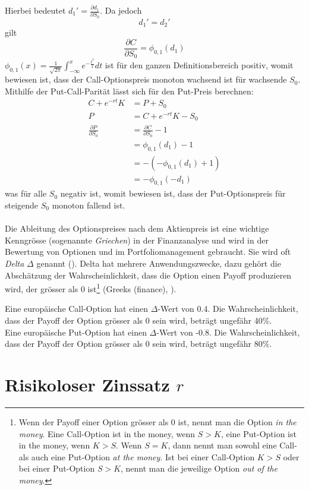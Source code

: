 \documentclass[11pt]{report} %
\newcommand\pd[2]{\displaystyle\frac{\partial #1}{\partial #2}}
\begin{document}
Hierbei bedeutet $d_1'=\pd{d_1}{S_0}$. Da jedoch $$d_1'=d_2'$$ gilt $$\pd{C}{S_0}=\phi_{0,1}(d_1)$$ $\phi_{0, 1}(x)=\frac{1}{\sqrt{2\pi}}\int_{-\infty}^{x}e^{-\frac{t^2}{2}}dt$ ist für den ganzen Definitionsbereich positiv, womit bewiesen ist, dass der Call-Optionspreis monoton wachsend ist für wachsende $S_0$. \\Mithilfe der Put-Call-Parität lässt sich für den Put-Preis berechnen:
    \begin{align*}
    C+e^{-rt}K&=P+S_0\\
    P&=C+e^{-rt}K-S_0\\
    \pd{P}{S_0}&=\pd{C}{S_0}-1\\
    &=\phi_{0,1}(d_1)-1\\
    &=-(-\phi_{0,1}(d_1)+1)\\
    &=-\phi_{0,1}(-d_1)
\end{align*}
was für alle $S_0$ negativ ist, womit bewiesen ist, dass  der Put-Optionspreis für steigende $S_0$ monoton fallend ist. \\\\Die Ableitung des Optionspreises nach dem Aktienpreis ist eine wichtige Kenngrösse (sogenannte \textit{Griechen}) in der Finanzanalyse und wird in der Bewertung von Optionen und im Portfoliomanagement gebraucht. Sie wird oft \textit{Delta} $\Delta$ genannt (\cite{hayes2023}). Delta hat mehrere Anwendungszwecke, dazu gehört die Abschätzung der Wahrscheinlichkeit, dass die Option einen Payoff produzieren wird, der grösser als 0 ist\footnote{Wenn der Payoff einer Option grösser als 0 ist, nennt man die Option \textit{in the money}. Eine Call-Option ist in the money, wenn $S>K$, eine Put-Option ist in the money, wenn $K>S$. Wenn $S=K$, dann nennt man sowohl eine Call- als auch eine Put-Option \textit{at the money}. Ist bei einer Call-Option $K>S$ oder bei einer Put-Option $S>K$, nennt man die jeweilige Option \textit{out of the money}.} (Greeks (finance), \cite{wikigreek2024}).
\begin{Beispiel}{}{}
    Eine europäische Call-Option hat einen $\Delta$-Wert von 0.4. Die Wahrscheinlichkeit, dass der Payoff der Option grösser als 0 sein wird, beträgt ungefähr 40\%.\\Eine europäische Put-Option hat einen $\Delta$-Wert von -0.8. Die Wahrscheinlichkeit, dass der Payoff der Option grösser als 0 sein wird, beträgt ungefähr 80\%.
\end{Beispiel}

\section{Risikoloser Zinssatz $r$}
\end{document}
